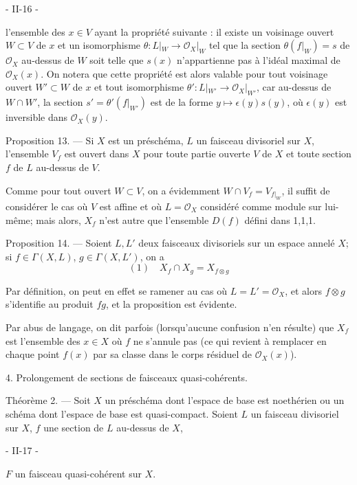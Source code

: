 - II-16 -

l'ensemble des $x \in V$ ayant la propriété suivante : il existe un voisinage ouvert $W \subset V$ de $x$ et un isomorphisme $\theta : L|_W \to \mathcal{O}_X|_W$ tel que la section $\theta(f|_W) = s$ de $\mathcal{O}_X$ au-dessus de $W$ soit telle que $s(x)$ n'appartienne pas à l'idéal maximal de $\mathcal{O}_X(x)$. On notera que cette propriété est alors valable pour tout voisinage ouvert $W' \subset W$ de $x$ et tout isomorphisme $\theta' : L|_{W'} \to \mathcal{O}_X|_{W'}$, car au-dessus de $W \cap W'$, la section $s' = \theta'(f|_{W'})$ est de la forme $y \mapsto \epsilon(y)s(y)$, où $\epsilon(y)$ est inversible dans $\mathcal{O}_X(y)$.

Proposition 13. — Si $X$ est un préschéma, $L$ un faisceau divisoriel sur $X$, l'ensemble $V_f$ est ouvert dans $X$ pour toute partie ouverte $V$ de $X$ et toute section $f$ de $L$ au-dessus de $V$.

Comme pour tout ouvert $W \subset V$, on a évidemment $W \cap V_f = V_{f|_W}$, il suffit de considérer le cas où $V$ est affine et où $L = \mathcal{O}_X$ considéré comme module sur lui-même; mais alors, $X_f$ n'est autre que l'ensemble $D(f)$ défini dans 1,1,1.

Proposition 14. — Soient $L, L'$ deux faisceaux divisoriels sur un espace annelé $X$; si $f \in \Gamma(X, L)$, $g \in \Gamma(X, L')$, on a
$$(1) \quad X_f \cap X_g = X_{f \otimes g}$$

Par définition, on peut en effet se ramener au cas où $L = L' = \mathcal{O}_X$, et alors $f \otimes g$ s'identifie au produit $fg$, et la proposition est évidente.

Par abus de langage, on dit parfois (lorsqu'aucune confusion n'en résulte) que $X_f$ est l'ensemble des $x \in X$ où $f$ ne s'annule pas (ce qui revient à remplacer en chaque point $f(x)$ par sa classe dans le corps résiduel de $\mathcal{O}_X(x)$).

4. Prolongement de sections de faisceaux quasi-cohérents.

Théorème 2. — Soit $X$ un préschéma dont l'espace de base est noethérien ou un schéma dont l'espace de base est quasi-compact. Soient $L$ un faisceau divisoriel sur $X$, $f$ une section de $L$ au-dessus de $X$,

\newpage


- II-17 -

$F$ un faisceau quasi-cohérent sur $X$.

